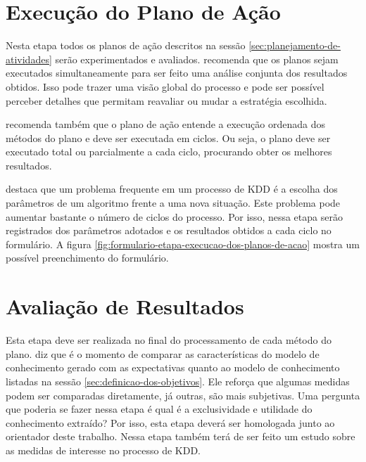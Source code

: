 \documentclass[diss-proposta,nocipinfo]{texufpel}
\begin{document}
\section{Execução do Plano de Ação}
\label{sec:execucao-do-plano-de-acao}

Nesta etapa todos os planos de ação descritos na sessão \ref{sec:planejamento-de-atividades} serão experimentados e avaliados. \citet{goldschmidt2015data} recomenda que os planos sejam executados simultaneamente para ser feito uma análise conjunta dos resultados obtidos. Isso pode trazer uma visão global do processo e pode ser possível perceber detalhes que permitam reavaliar ou mudar a estratégia escolhida.

\citet{goldschmidt2015data} recomenda também que o plano de ação entende a execução ordenada dos métodos do plano e deve ser executada em ciclos. Ou seja, o plano deve ser executado total ou parcialmente a cada ciclo, procurando obter os melhores resultados.

\citet{goldschmidt2015data} destaca que um problema frequente em um processo de KDD é a escolha dos parâmetros de um algoritmo frente a uma nova situação. Este problema pode aumentar bastante o número de ciclos do processo. Por isso, nessa etapa serão registrados dos parâmetros adotados e os resultados obtidos a cada ciclo no formulário. A figura \ref{fig:formulario-etapa-execucao-dos-planos-de-acao} mostra um possível preenchimento do formulário.

\section{Avaliação de Resultados}
\label{sec:avaliacao-de-resultados}

Esta etapa deve ser realizada no final do processamento de cada método do plano. \citet{goldschmidt2015data} diz que é o momento de comparar as características do modelo de conhecimento gerado com as expectativas quanto ao modelo de conhecimento listadas na sessão \ref{sec:definicao-dos-objetivos}. Ele reforça que algumas medidas podem ser comparadas diretamente, já outras, são mais subjetivas. Uma pergunta que poderia se fazer nessa etapa é qual é a exclusividade e utilidade do conhecimento extraído? Por isso, esta etapa deverá ser homologada junto ao orientador deste trabalho. Nessa etapa também terá de ser feito um estudo sobre as medidas de interesse no processo de KDD.
\end{document}
